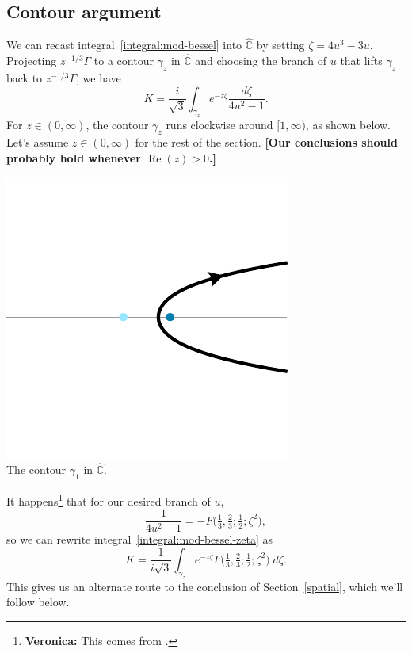 \documentclass{article}
\newcommand{\C}{\mathbb{C}}
\begin{document}
\subsection{Contour argument}\label{contour-argument}
We can recast integral~\ref{integral:mod-bessel} into $\hat{\C}$ by setting $\zeta = 4u^3 - 3u$. Projecting $z^{-1/3} \Gamma$ to a contour $\gamma_z$ in $\hat{\C}$ and choosing the branch of $u$ that lifts $\gamma_z$ back to $z^{-1/3} \Gamma$, we have
\begin{equation}\label{integral:mod-bessel-zeta}
K = \frac{i}{\sqrt{3}} \int_{\gamma_z} e^{-z\zeta}\frac{d\zeta}{4u^2 - 1}.
\end{equation}
For $z \in (0, \infty)$, the contour $\gamma_z$ runs clockwise around $[1, \infty)$, as shown below. Let's assume $z \in (0, \infty)$ for the rest of the section. \textbf{[Our conclusions should probably hold whenever $\operatorname{Re}(z) > 0$.]}
\begin{center}
\includegraphics{figures/zeta_contour_3.pdf} \\[1em]
{\small The contour $\gamma_1$ in $\hat{\C}$.}
\end{center}

It happens\footnote{\textbf{Veronica:} This comes from \cite[equation~15.4.14]{dlmf}.} that for our desired branch of $u$,
\[ \frac{1}{4u^2 - 1} = -F\big(\tfrac{1}{3}, \tfrac{2}{3}; \tfrac{1}{2}; \zeta^2\big), \]
so we can rewrite integral~\ref{integral:mod-bessel-zeta} as
\[ K = \frac{1}{i\sqrt{3}} \int_{\gamma_z} e^{-z\zeta} F\big(\tfrac{1}{3}, \tfrac{2}{3}; \tfrac{1}{2}; \zeta^2\big)\;d\zeta. \]
This gives us an alternate route to the conclusion of Section~\ref{spatial}, which we'll follow below.
\end{document}
